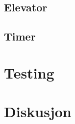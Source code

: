 \documentclass{article}
\begin{document}
\subsection{Elevator}
\subsection{Timer}
\section{Testing}
\section{Diskusjon}
\end{document}
